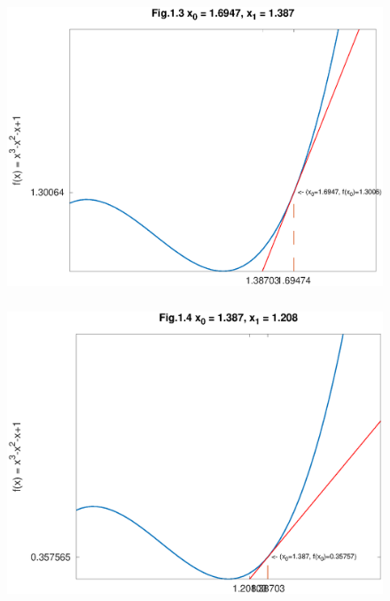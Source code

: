 \documentclass[12pt]{article}
\begin{document}
\begin{figure}[htbp]
    \begin{center}
        \includegraphics[height=90mm]{octave-fig/Fig.1.3.eps}
        \includegraphics[height=90mm]{octave-fig/Fig.1.4.eps}
    \end{center}
\end{figure}
\end{document}

